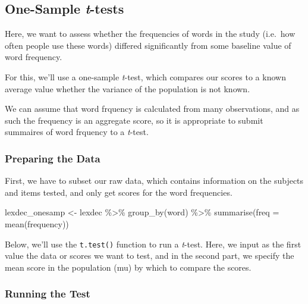 \documentclass[
]{book}
\newenvironment{Shaded}{\begin{snugshade}}{\end{snugshade}}
\newcommand{\AttributeTok}[1]{\textcolor[rgb]{0.77,0.63,0.00}{#1}}
\newcommand{\FunctionTok}[1]{\textcolor[rgb]{0.00,0.00,0.00}{#1}}
\newcommand{\NormalTok}[1]{#1}
\newcommand{\OtherTok}[1]{\textcolor[rgb]{0.56,0.35,0.01}{#1}}
\newcommand{\SpecialCharTok}[1]{\textcolor[rgb]{0.00,0.00,0.00}{#1}}
\begin{document}
\hypertarget{one-sample-t-tests}{%
\subsection{\texorpdfstring{One-Sample \emph{t}-tests}{One-Sample t-tests}}\label{one-sample-t-tests}}

Here, we want to assess whether the frequencies of words in the study (i.e.~how often people use these words) differed significantly from some baseline value of word frequency.

For this, we'll use a one-sample \emph{t}-test, which compares our scores to a known average value whether the variance of the population is not known.

We can assume that word frquency is calculated from many observations, and as such the frequency is an aggregate score, so it is appropriate to submit summaires of word frquency to a \emph{t}-test.

\hypertarget{preparing-the-data}{%
\subsubsection{Preparing the Data}\label{preparing-the-data}}

First, we have to subset our raw data, which contains information on the subjects and items tested, and only get scores for the word frequencies.

\begin{Shaded}
\begin{Highlighting}[]
\NormalTok{lexdec\_onesamp }\OtherTok{\textless{}{-}}\NormalTok{ lexdec }\SpecialCharTok{\%\textgreater{}\%} 
  \FunctionTok{group\_by}\NormalTok{(word) }\SpecialCharTok{\%\textgreater{}\%}
  \FunctionTok{summarise}\NormalTok{(}\AttributeTok{freq =} \FunctionTok{mean}\NormalTok{(frequency))}
\end{Highlighting}
\end{Shaded}

Below, we'll use the \texttt{t.test()} function to run a \emph{t}-test. Here, we input as the first value the data or scores we want to test, and in the second part, we specify the mean score in the population (mu) by which to compare the scores.

\hypertarget{running-the-test}{%
\subsubsection{Running the Test}\label{running-the-test}}
\end{document}

